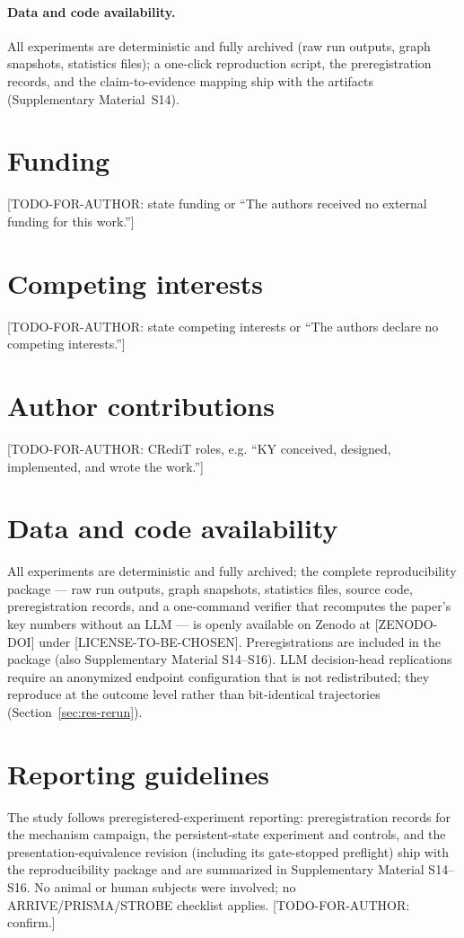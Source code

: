 \documentclass[10pt]{article}
\begin{document}
\paragraph{Data and code availability.} All experiments are deterministic and fully archived (raw run outputs, graph snapshots, statistics files); a one-click reproduction script, the preregistration records, and the claim-to-evidence mapping ship with the artifacts (Supplementary Material~S14).


\section*{Funding}
[TODO-FOR-AUTHOR: state funding or ``The authors received no external funding for this work.'']

\section*{Competing interests}
[TODO-FOR-AUTHOR: state competing interests or ``The authors declare no competing interests.'']

\section*{Author contributions}
[TODO-FOR-AUTHOR: CRediT roles, e.g. ``KY conceived, designed, implemented, and wrote the work.'']

\section*{Data and code availability}
All experiments are deterministic and fully archived; the complete reproducibility package --- raw run outputs, graph snapshots, statistics files, source code, preregistration records, and a one-command verifier that recomputes the paper's key numbers without an LLM --- is openly available on Zenodo at [ZENODO-DOI] under [LICENSE-TO-BE-CHOSEN]. Preregistrations are included in the package (also Supplementary Material S14--S16). LLM decision-head replications require an anonymized endpoint configuration that is not redistributed; they reproduce at the outcome level rather than bit-identical trajectories (Section~\ref{sec:res-rerun}).

\section*{Reporting guidelines}
The study follows preregistered-experiment reporting: preregistration records for the mechanism campaign, the persistent-state experiment and controls, and the presentation-equivalence revision (including its gate-stopped preflight) ship with the reproducibility package and are summarized in Supplementary Material S14--S16. No animal or human subjects were involved; no ARRIVE/PRISMA/STROBE checklist applies. [TODO-FOR-AUTHOR: confirm.]



\end{document}

